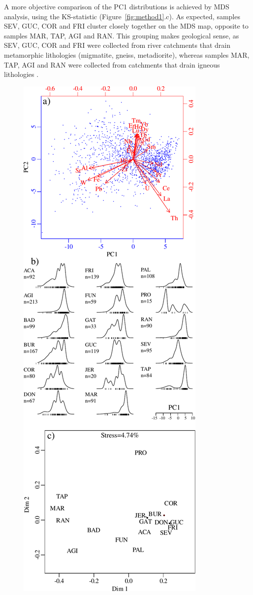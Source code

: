 \documentclass{article}
\begin{document}
A more objective comparison of the PC1 distributions is achieved by
MDS analysis, using the KS-statistic (Figure~\ref{fig:method1}.c).  As
expected, samples SEV, GUC, COR and FRI cluster closely together on
the MDS map, opposite to samples MAR, TAP, AGI and RAN. This grouping
makes geological sense, as SEV, GUC, COR and FRI were collected from
river catchments that drain metamorphic lithologies (migmatite,
gneiss, metadiorite), whereas samples MAR, TAP, AGI and RAN were
collected from catchments that drain igneous lithologies
\cite{caracciolo2023}.

\begin{figure}
\includegraphics[height=.7\textheight]{Fig2.pdf}

\end{figure}
\end{document}
